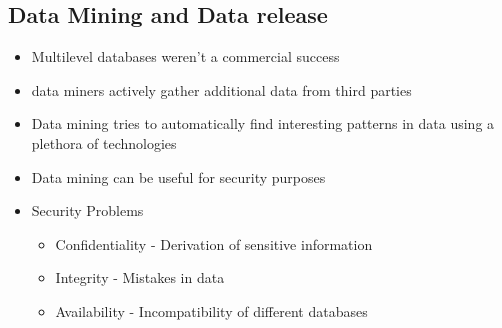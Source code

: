 \documentclass[twoside]{article}
\begin{document}
\subsection{Data Mining and Data release}
\begin{itemize}
\item Multilevel databases weren’t a commercial success
\item data miners actively gather additional data from third parties
\item Data mining tries to automatically find interesting patterns in data using a plethora of technologies
\item Data mining can be useful for security purposes
\item Security Problems
\begin{itemize}
\item Confidentiality - Derivation of sensitive information
\item Integrity - Mistakes in data
\item Availability - Incompatibility of different databases  
\end{itemize}
\end{itemize}
\end{document}
